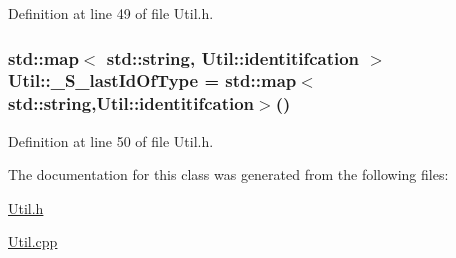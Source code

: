 Definition at line 49 of file Util.\-h.

\hypertarget{class_util_a06a8897362f4bd17c68d59557083fc56}{
\subsubsection[{\-\_\-\-S\-\_\-last\-Id\-Of\-Type}]{\setlength{\rightskip}{0pt plus 5cm}std\-::map$<$ std\-::string, {\bf Util\-::identitifcation} $>$ Util\-::\-\_\-\-S\-\_\-last\-Id\-Of\-Type = std\-::map$<$std\-::string,{\bf Util\-::identitifcation}$>$()\hspace{0.3cm}{\ttfamily [static]}}}\label{class_util_a06a8897362f4bd17c68d59557083fc56}


Definition at line 50 of file Util.\-h.



The documentation for this class was generated from the following files\-:\begin{DoxyCompactItemize}
\item 
\hyperlink{_util_8h}{Util.\-h}\item 
\hyperlink{_util_8cpp}{Util.\-cpp}\end{DoxyCompactItemize}
